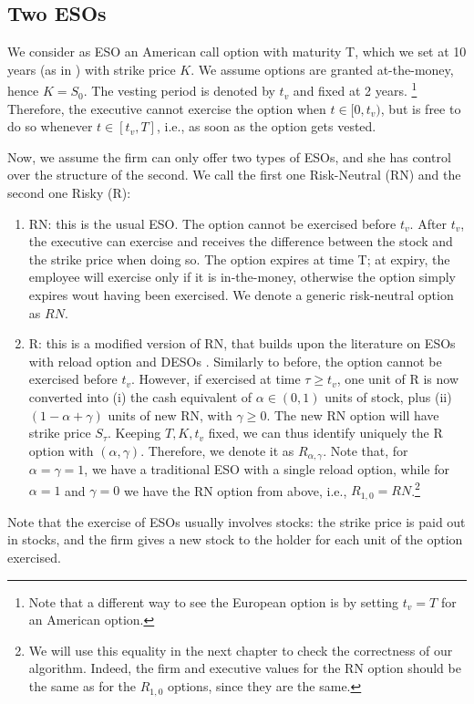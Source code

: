 \subsection{Two ESOs}
We consider as ESO an American call option with maturity T, which we set at 10 years (as in \citet{marquardt2002cost}) with strike price $K$. We assume options are granted at-the-money, hence $K=S_0$. The vesting period is denoted by $t_v$ and fixed at 2 years. \footnote{Note that a different way to see the European option is by setting $t_v = T$ for an American option.} 
Therefore, the executive cannot exercise the option when $t \in [0, t_v)$, but is free to do so whenever $t \in [t_v, T]$, i.e., as soon as the option gets vested. 

Now, we assume the firm can only offer two types of ESOs, and she has control over the structure of the second. We call the first one Risk-Neutral (RN) and the second one Risky (R):
\begin{enumerate}
    \item RN: this is the usual ESO. The option cannot be exercised before $t_v$. After $t_v$, the executive can exercise and receives the difference between the stock and the strike price when doing so. The option expires at time T; at expiry, the employee will exercise only if it is in-the-money, otherwise the option simply expires wout having been exercised. We denote a generic risk-neutral option as $RN$.
    \item R: this is a modified version of RN, that builds upon the literature on ESOs with reload option and DESOs \citep{huang2013dynamic}.
    Similarly to before, the option cannot be exercised before $t_v$. However, if exercised at time $\tau \ge t_v$, one unit of R is now converted into (i) the cash equivalent of $\alpha \in (0,1)$ units of stock, plus (ii) $(1 - \alpha + \gamma)$ units of new RN, with $\gamma \ge 0$. The new RN option will have strike price $S_\tau$. Keeping $T, K, t_v$ fixed, we can thus identify uniquely the R option with $(\alpha, \gamma)$. Therefore, we denote it as $R_{\alpha, \gamma}$. Note that, for $\alpha = \gamma = 1$, we have a traditional ESO with a single reload option, while for $\alpha = 1$ and $\gamma = 0$ we have the RN option from above, i.e., $R_{1, 0} = RN$.\footnote{We will use this equality in the next chapter to check the correctness of our algorithm. Indeed, the firm and executive values for the RN option should be the same as for the $R_{1,0}$ options, since they are the same.}
\end{enumerate}
Note that the exercise of ESOs usually involves stocks: the strike price is paid out in stocks, and the firm gives a new stock to the holder for each unit of the option exercised. 
